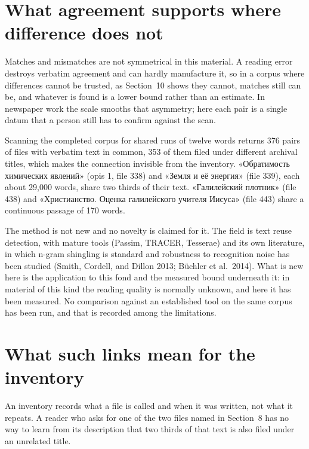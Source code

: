 \documentclass[11pt,a4paper]{article}
\begin{document}
\section{What agreement supports where difference does not}\label{what-agreement-supports-where-difference-does-not}

Matches and mismatches are not symmetrical in this material. A reading error
destroys verbatim agreement and can hardly manufacture it, so in a corpus
where differences cannot be trusted, as Section~10 shows they cannot, matches
still can be, and whatever is found is a lower bound rather than an estimate.
In newspaper work the scale smooths that asymmetry; here each pair is a single
datum that a person still has to confirm against the scan.

Scanning the completed corpus for shared runs of twelve words returns 376
pairs of files with verbatim text in common, 353 of them filed under different
archival titles, which makes the connection invisible from the inventory.
«Обратимость химических явлений» (opis 1, file 338) and «Земля и её энергия»
(file 339), each about 29,000 words, share two thirds of their text.
«Галилейский плотник» (file 438) and «Христианство. Оценка галилейского
учителя Иисуса» (file 443) share a continuous passage of 170 words.

The method is not new and no novelty is claimed for it. The field is text
reuse detection, with mature tools (Passim, TRACER, Tesserae) and its own
literature, in which n-gram shingling is standard and robustness to
recognition noise has been studied (Smith, Cordell, and Dillon 2013; Büchler
et al.~2014). What is new here is the application to this fond and the
measured bound underneath it: in material of this kind the reading quality is
normally unknown, and here it has been measured. No comparison against an
established tool on the same corpus has been run, and that is recorded among
the limitations.

\section{What such links mean for the inventory}\label{what-such-links-mean-for-the-inventory}

An inventory records what a file is called and when it was written, not what
it repeats. A reader who asks for one of the two files named in Section~8 has
no way to learn from its description that two thirds of that text is also
filed under an unrelated title.
\end{document}
